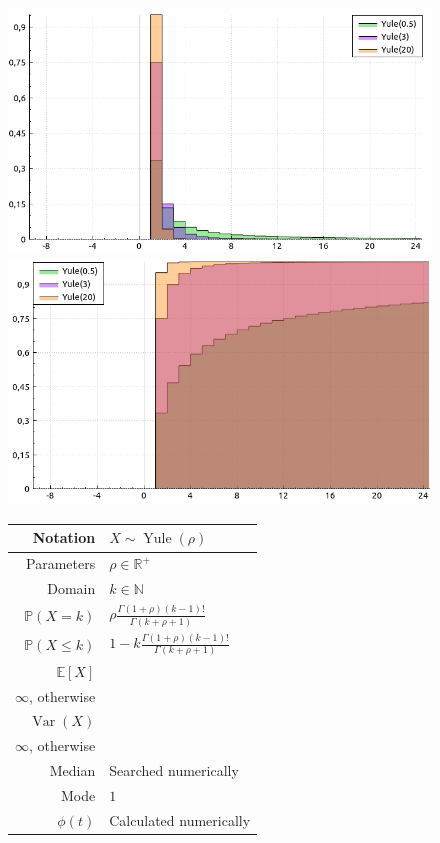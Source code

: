 \documentclass[a4paper,11pt]{article}
\theoremstyle{plain}
\theoremstyle{definition}
\newcommand{\ME}{\mathbb{E}}
\newcommand{\MR}{\mathbb{R}}
\newcommand{\MP}{\mathbb{P}}
\newcommand{\MN}{\mathbb{N}}
\newcommand{\Var}{\operatorname{Var}}
\begin{document}
	\begin{figure}[!htb]\centering
		\begin{minipage}{0.55\textwidth}
			\includegraphics[width=\linewidth, right]{yule_pmf}
			\captionsetup{labelformat=empty}
			\includegraphics[width=\linewidth, right]{yule_cdf}
			\captionsetup{labelformat=empty}
		\end{minipage}
		\begin{minipage}{0.4\textwidth}
			\begin{tabular}{| r | l |}
				\hline
				Notation & $ X \sim \operatorname{Yule}(\rho) $ \\
				\hline
				Parameters & $\rho \in \MR^+$ \\
				\hline
				Domain & $ k \in \MN $  \\
				\hline
				$\MP(X = k)$ & $\rho \frac{ \Gamma(1+\rho) (k-1)! } {\Gamma(k+\rho+1)} $ \\
				\hline
				$\MP(X \leq k)$ & $1-k \frac{ \Gamma(1+\rho) (k-1)! } {\Gamma(k+\rho+1)} $ \\
				\hline
				$\ME[X]$ & \pbox{\linewidth}{$ \frac{\rho}{\rho - 1}$, $\rho > 1$ \\ $\infty$, otherwise } \\
				\hline
				$\Var(X)$ & \pbox{\linewidth}{$ \frac{\rho^2}{(\rho - 1)^2(\rho-2)}$, $\rho > 2$ \\ $\infty$, otherwise } \\
				\hline
				Median & Searched numerically \\
				\hline
				Mode & $1 $ \\
				\hline
				$\phi(t)$ & Calculated numerically \\
				\hline
			\end{tabular}
		\end{minipage}
	\end{figure}
\end{document}
